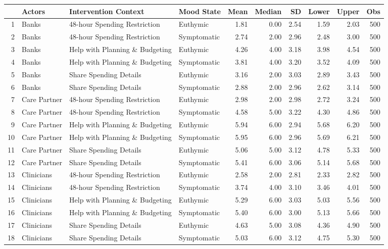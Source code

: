 \begin{table}[ht]
\centering
\begin{tabular}{rlllrrrrrr}
  \hline
 & Actors & Intervention Context & Mood State & Mean & Median & SD & Lower & Upper & Obs \\ 
  \hline
1 & Banks & 48-hour Spending Restriction & Euthymic & 1.81 & 0.00 & 2.54 & 1.59 & 2.03 & 500 \\ 
  2 & Banks & 48-hour Spending Restriction & Symptomatic & 2.74 & 2.00 & 2.96 & 2.48 & 3.00 & 500 \\ 
  3 & Banks & Help with Planning \& Budgeting & Euthymic & 4.26 & 4.00 & 3.18 & 3.98 & 4.54 & 500 \\ 
  4 & Banks & Help with Planning \& Budgeting & Symptomatic & 3.81 & 4.00 & 3.20 & 3.52 & 4.09 & 500 \\ 
  5 & Banks & Share Spending Details & Euthymic & 3.16 & 2.00 & 3.03 & 2.89 & 3.43 & 500 \\ 
  6 & Banks & Share Spending Details & Symptomatic & 2.88 & 2.00 & 2.96 & 2.62 & 3.14 & 500 \\ 
  7 & Care Partner & 48-hour Spending Restriction & Euthymic & 2.98 & 2.00 & 2.98 & 2.72 & 3.24 & 500 \\ 
  8 & Care Partner & 48-hour Spending Restriction & Symptomatic & 4.58 & 5.00 & 3.22 & 4.30 & 4.86 & 500 \\ 
  9 & Care Partner & Help with Planning \& Budgeting & Euthymic & 5.94 & 6.00 & 2.94 & 5.68 & 6.20 & 500 \\ 
  10 & Care Partner & Help with Planning \& Budgeting & Symptomatic & 5.95 & 6.00 & 2.96 & 5.69 & 6.21 & 500 \\ 
  11 & Care Partner & Share Spending Details & Euthymic & 5.06 & 5.00 & 3.12 & 4.78 & 5.33 & 500 \\ 
  12 & Care Partner & Share Spending Details & Symptomatic & 5.41 & 6.00 & 3.06 & 5.14 & 5.68 & 500 \\ 
  13 & Clinicians & 48-hour Spending Restriction & Euthymic & 2.58 & 2.00 & 2.81 & 2.33 & 2.82 & 500 \\ 
  14 & Clinicians & 48-hour Spending Restriction & Symptomatic & 3.74 & 4.00 & 3.10 & 3.46 & 4.01 & 500 \\ 
  15 & Clinicians & Help with Planning \& Budgeting & Euthymic & 5.29 & 6.00 & 3.03 & 5.03 & 5.56 & 500 \\ 
  16 & Clinicians & Help with Planning \& Budgeting & Symptomatic & 5.40 & 6.00 & 3.00 & 5.13 & 5.66 & 500 \\ 
  17 & Clinicians & Share Spending Details & Euthymic & 4.63 & 5.00 & 3.08 & 4.36 & 4.90 & 500 \\ 
  18 & Clinicians & Share Spending Details & Symptomatic & 5.03 & 6.00 & 3.12 & 4.75 & 5.30 & 500 \\ 
   \hline
\end{tabular}
\end{table}
